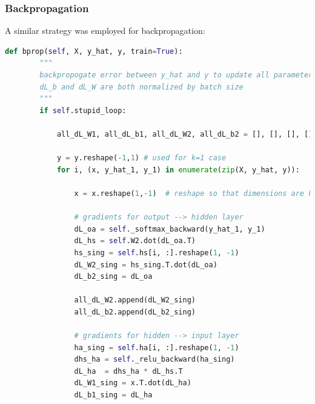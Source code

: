 \documentclass[reqno]{amsart}
\theoremstyle{definition}
\theoremstyle{remark}
\numberwithin{equation}{section}
\begin{document}
\subsubsection{Backpropagation}

A similar strategy was employed for backpropagation: 

\begin{lstlisting}[language=Python]
    def bprop(self, X, y_hat, y, train=True):                                   
        """                                                                     
        backpropogate error between y_hat and y to update all parameters        
        dL_b and dL_W are both normalized by batch size                         
        """                                                                     
        if self.stupid_loop:                                                    
                                                                                
            all_dL_W1, all_dL_b1, all_dL_W2, all_dL_b2 = [], [], [], []         
                                                                                
            y = y.reshape(-1,1) # used for k=1 case                             
            for i, (x, y_hat_1, y_1) in enumerate(zip(X, y_hat, y)):            
                                                                                
                x = x.reshape(1,-1)  # reshape so that dimensions are kosher    
                                                                                
                # gradients for output --> hidden layer                         
                dL_oa = self._softmax_backward(y_hat_1, y_1)                    
                dL_hs = self.W2.dot(dL_oa.T)                                    
                hs_sing = self.hs[i, :].reshape(1, -1)                          
                dL_W2_sing = hs_sing.T.dot(dL_oa)                               
                dL_b2_sing = dL_oa                                              
                                                                                
                all_dL_W2.append(dL_W2_sing)                                    
                all_dL_b2.append(dL_b2_sing)                                    
                                                                                
                # gradients for hidden --> input layer                          
                ha_sing = self.ha[i, :].reshape(1, -1)                          
                dhs_ha = self._relu_backward(ha_sing)                           
                dL_ha  = dhs_ha * dL_hs.T                                       
                dL_W1_sing = x.T.dot(dL_ha)                                     
                dL_b1_sing = dL_ha                                              
                                                                                

\end{lstlisting}
\end{document}
